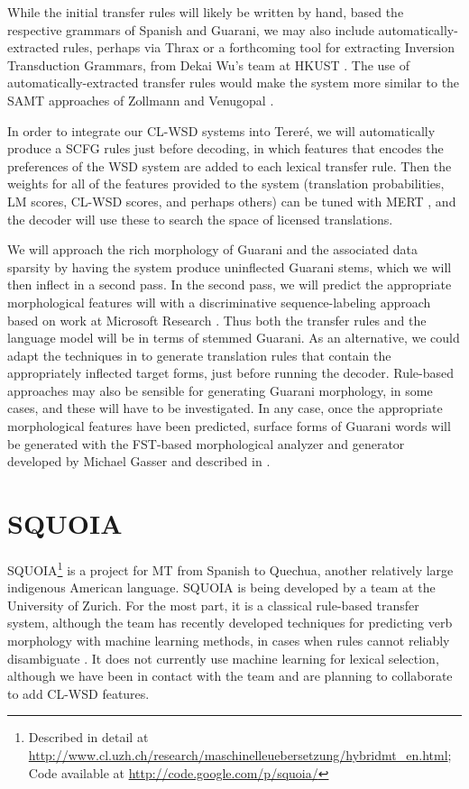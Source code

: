 While the initial transfer rules will likely be written by hand, based the
respective grammars of Spanish and Guarani, we may also include
automatically-extracted rules, perhaps via Thrax \cite{weese-EtAl:2011:WMT} or
a forthcoming tool for extracting Inversion Transduction Grammars, from Dekai
Wu's team at HKUST \cite{saers-addanki-wu:2013:HyTra}.
The use of automatically-extracted transfer rules would make the system more
similar to the SAMT approaches of Zollmann and Venugopal
\cite{zollmann-venugopal:2006:WMT}.

In order to integrate our CL-WSD systems into Tereré, we will automatically
produce a SCFG rules just before decoding, in which features that encodes the
preferences of the WSD system are added to each lexical transfer rule. Then
the weights for all of the features provided to the system (translation
probabilities, LM scores, CL-WSD scores, and perhaps others) can be tuned with
MERT \cite{och:2003:ACL}, and the decoder will use these to search the space of
licensed translations.

We will approach the rich morphology of Guarani and the associated data
sparsity by having the system produce uninflected Guarani stems, which we will
then inflect in a second pass.
In the second pass, we will predict the appropriate morphological features will
with a discriminative sequence-labeling approach based on work at Microsoft
Research \cite{toutanova-suzuki-ruopp:2008:ACLMain}.
Thus both the transfer rules and the language model will be in terms of stemmed
Guarani.
As an alternative, we could adapt the techniques in
\cite{chahuneau:2013:emnlp} to generate translation rules that contain the
appropriately inflected target forms, just before running the decoder.
Rule-based approaches may also be sensible for generating Guarani morphology,
in some cases, and these will have to be investigated. In any case, once the
appropriate morphological features have been predicted, surface forms of
Guarani words will be generated with the FST-based morphological analyzer and
generator developed by Michael Gasser and described in
\cite{rudnick-gasser:2013:HyTra-2013}.

\section{SQUOIA}
SQUOIA\footnote{Described in detail at
\url{http://www.cl.uzh.ch/research/maschinelleuebersetzung/hybridmt_en.html}; 
Code available at \url{http://code.google.com/p/squoia/}}
is a project for MT from Spanish to Quechua, another relatively large
indigenous American language. SQUOIA is being developed by a team at the
University of Zurich. For the most part, it is a classical rule-based transfer
system, although the team has recently developed techniques for predicting verb
morphology with machine learning methods, in cases when rules cannot reliably
disambiguate \cite{riosgonzales-gohring:2013:HyTra}. It does not currently use
machine learning for lexical selection, although we have been in contact with
the team and are planning to collaborate to add CL-WSD features.

